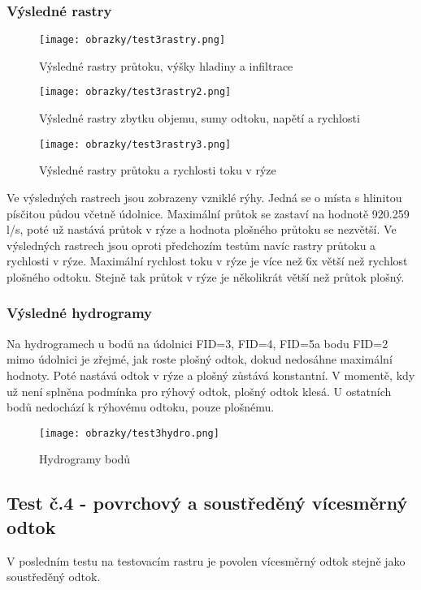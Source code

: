 \subsubsection{Výsledné rastry} \label{subsubsection:test3rastry}
\begin{figure}[hbt]
  \centering
  \texttt{[image: obrazky/test3rastry.png]}
  \caption{Výsledné rastry průtoku, výšky hladiny a infiltrace}
  \label{fig:test3rastry}
\end{figure}
\clearpage
\newpage
\begin{figure}[hbt]
  \centering
  \texttt{[image: obrazky/test3rastry2.png]}
  \caption{Výsledné rastry zbytku objemu, sumy odtoku, napětí a rychlosti}
  \label{fig:test3rastry2}
\end{figure}
\clearpage
\newpage
\begin{figure}[t]
  \centering
  \texttt{[image: obrazky/test3rastry3.png]}
  \caption{Výsledné rastry průtoku a rychlosti toku v rýze}
  \label{fig:test3rastry3}
\end{figure}
Ve výsledných rastrech jsou zobrazeny vzniklé rýhy. Jedná se o místa s hlinitou písčitou půdou včetně údolnice. 
Maximální průtok se zastaví na hodnotě 920.259 l/s, poté už nastává průtok v rýze a hodnota plošného průtoku se nezvětší. Ve výsledných rastrech jsou oproti předchozím testům navíc rastry průtoku a rychlosti v rýze.
Maximální rychlost toku v rýze je více než 6x větší než rychlost plošného odtoku. Stejně tak průtok v rýze je několikrát větší než průtok plošný. 
\clearpage
\subsubsection{Výsledné hydrogramy} \label{subsubsection:test3hydro}
Na hydrogramech u bodů na údolnici FID=3, FID=4, FID=5a bodu FID=2 mimo údolnici je zřejmé, jak roste plošný odtok, dokud nedosáhne maximální hodnoty. Poté nastává odtok v rýze a plošný zůstává konstantní. V momentě, kdy už není splněna podmínka pro rýhový odtok, plošný odtok klesá.
U ostatních bodů nedochází k rýhovému odtoku, pouze plošnému. \medskip
\begin{figure}[hbt]
  \centering
  \texttt{[image: obrazky/test3hydro.png]}
  \caption{Hydrogramy bodů}
  \label{fig:test3hydro}
\end{figure} 
\clearpage
\subsection{Test č.4 - povrchový a soustředěný vícesměrný odtok} \label{subsection:test4testovni}
V posledním testu na testovacím rastru je povolen vícesměrný odtok stejně jako soustředěný odtok.  
